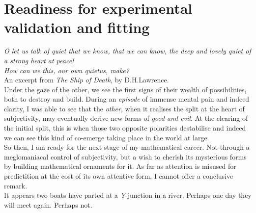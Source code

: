 \section{Readiness for experimental validation and fitting}\label{expFitting}

\textit{O let us talk of quiet that we know,
that we can know, the deep and lovely quiet
of a strong heart at peace!}
\\
\textit{How can we this, our own quietus, make?}
\\

An excerpt from \textit{The Ship of Death}, by D.H.Lawrence.
\\

Under the gaze of the other, we see the first signs 
of their wealth of possibilities, both to destroy and build.
During an \textit{episode} of immense mental pain and indeed 
clarity, I was able to see that the \textit{other}, when 
it realises the split at the heart of subjectivity, 
may eventually derive new forms of \textit{good and evil}. 
At the clearing of the initial split, 
this is when those two opposite polarities destabilise and indeed
we can see this kind of co-emerge taking place 
in the world at large.
\\

So then, I am ready for the next stage of my mathematical career. 
Not through a meglomaniacal control of subjectivity, 
but a wish to cherish its mysterious forms by 
building mathematical ornaments for it. As far 
as attention is misused for predictition at the cost 
of its own attentive form, I cannot offer a conclusive remark.
\\

It appears two boats have parted at a \textit{Y}-junction in a river. 
Perhaps one day they will meet again. Perhaps not.








